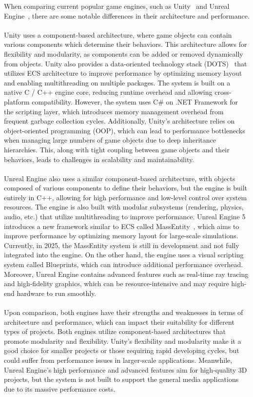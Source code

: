 When comparing current popular game engines, such as Unity~\cite{Unity_Engine} and Unreal Engine~\cite{Unreal_Engine}, 
there are some notable differences in their architecture and performance.
\\\\
Unity uses a component-based architecture, where game objects can contain various components which 
determine their behaviors.
This architecture allows for flexibility and modularity, as components can be added or removed dynamically 
from objects.
Unity also provides a data-oriented technology stack (DOTS)~\cite{Unity_DOTS} that utilizes
ECS architecture to improve performance by optimizing memory layout and enabling multithreading on 
multiple packages.
The system is built on a native C / C++ engine core, reducing runtime overhead and allowing
cross-platform compatibility.
However, the system uses C\# on .NET Framework for the scripting layer, which introduces memory management
overhead from frequent garbage collection cycles.
Additionally, Unity's architecture relies on object-oriented programming (OOP), which can lead to performance 
bottlenecks when managing large numbers of game objects due to deep inheritance hierarchies.
This, along with tight coupling between game objects and their behaviors, leads to challenges in scalability and maintainability.
\\\\
Unreal Engine also uses a similar component-based architecture, with objects composed of various components 
to define their behaviors, but the engine is built entirely in C++, allowing for high 
performance and low-level control over system resources.
The engine is also built with modular subsystems (rendering, physics, audio, etc.) that utilize multithreading 
to improve performance.
Unreal Engine 5 introduces a new framework similar to ECS called MassEntity~\cite{Unreal_MassEntity}, which aims to 
improve performance by optimizing memory layout for large-scale simulations.
Currently, in 2025, the MassEntity system is still in development and not fully integrated into the engine.
On the other hand, the engine uses a visual scripting system called Blueprints, which can introduce additional 
performance overhead.
Moreover, Unreal Engine contains advanced features such as real-time ray tracing and high-fidelity graphics, 
which can be resource-intensive and may require high-end hardware to run smoothly.
\\\\
Upon comparison, both engines have their strengths and weaknesses in terms of architecture and performance, 
which can impact their suitability for different types of projects.
Both engines utilize component-based architectures that promote modularity and flexibility.
Unity's flexibility and modularity make it a good choice for smaller projects or those requiring rapid 
developing cycles, but could suffer from performance issues in larger-scale applications.
Meanwhile, Unreal Engine's high performance and advanced features aim for high-quality
3D projects, but the system is not built to support the general media applications due to its massive 
performance costs.

